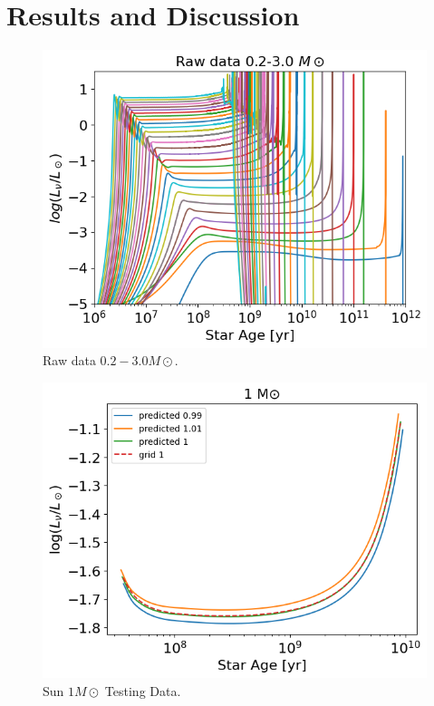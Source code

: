 \section{Results and Discussion}

\begin{figure}[H]
	\centering
	\includegraphics[width=\textwidth]{assets/raw.png}
	\caption{Raw data $0.2-3.0 M\odot$.}
	\label{fig:raw}
\end{figure}

\begin{figure}[H]
	\centering
	\includegraphics[width=\textwidth]{assets/output1.png}
	\caption{Sun $1M\odot$ Testing Data.}
	\label{fig:SunTest}
\end{figure}

